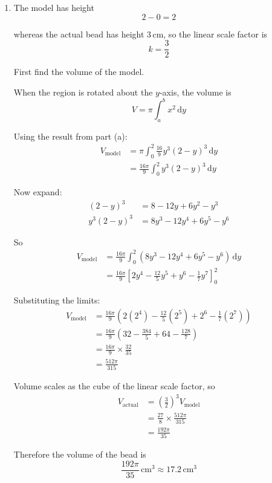 \documentclass[leqno]{article}
\begin{document}
\begin{enumerate}[
  label=\textbf{\arabic*.},
  leftmargin=*,
  topsep=0pt,
  partopsep=0pt,
  parsep=0pt
]
\begin{djsSolution}
\begin{enumerate}[label=\textbf{(\alph*)}]
Thus a Cartesian equation of $C$ is
\[
x^2=\frac{16}{9}y^3(2-y)^3
\]

  \item The model has height
\[
2-0=2
\]

whereas the actual bead has height $3\,\mathrm{cm}$, so the linear scale factor is
\[
k=\frac32
\]

First find the volume of the model.

When the region is rotated about the $y$-axis, the volume is
\[
V=\pi\int_a^b x^2\,\mathrm{d}y
\]

Using the result from part (a):
\begin{align*}
V_{\text{model}}&=\pi\int_0^2 \frac{16}{9}y^3(2-y)^3\,\mathrm{d}y\\
&=\frac{16\pi}{9}\int_0^2 y^3(2-y)^3\,\mathrm{d}y
\end{align*}

Now expand:
\begin{align*}
(2-y)^3&=8-12y+6y^2-y^3\\
y^3(2-y)^3&=8y^3-12y^4+6y^5-y^6
\end{align*}

So
\begin{align*}
V_{\text{model}}
&=\frac{16\pi}{9}\int_0^2 \left(8y^3-12y^4+6y^5-y^6\right)\,\mathrm{d}y\\
&=\frac{16\pi}{9}\left[2y^4-\frac{12}{5}y^5+y^6-\frac17 y^7\right]_0^2
\end{align*}

Substituting the limits:
\begin{align*}
V_{\text{model}}
&=\frac{16\pi}{9}\left(2(2^4)-\frac{12}{5}(2^5)+2^6-\frac17(2^7)\right)\\
&=\frac{16\pi}{9}\left(32-\frac{384}{5}+64-\frac{128}{7}\right)\\
&=\frac{16\pi}{9}\times\frac{32}{35}\\
&=\frac{512\pi}{315}
\end{align*}

Volume scales as the cube of the linear scale factor, so
\begin{align*}
V_{\text{actual}}
&=\left(\frac32\right)^3 V_{\text{model}}\\
&=\frac{27}{8}\times \frac{512\pi}{315}\\
&=\frac{192\pi}{35}
\end{align*}

Therefore the volume of the bead is
\[
\frac{192\pi}{35}\,\mathrm{cm}^3 \approx 17.2\,\mathrm{cm}^3
\]
\end{enumerate}
\end{djsSolution}



\end{enumerate}
\end{document}
